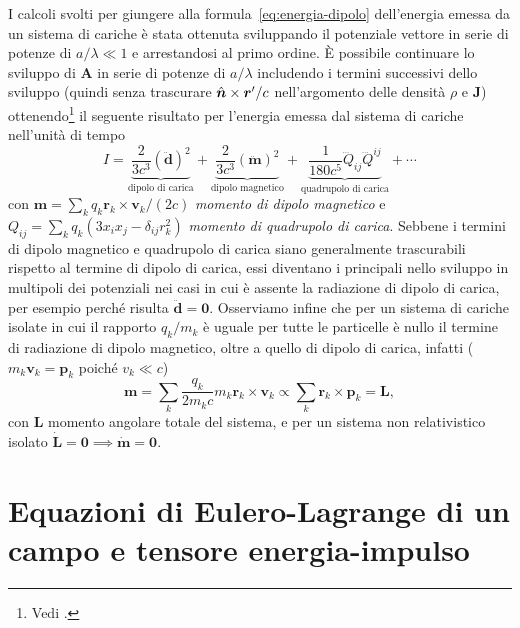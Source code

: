 I calcoli svolti per giungere alla formula~\eqref{eq:energia-dipolo}
dell'energia emessa da un sistema di cariche è stata ottenuta sviluppando il
potenziale vettore in serie di potenze di $a/\lambda \ll 1$ e arrestandosi al
primo ordine.  È possibile continuare lo sviluppo di $\bm{A}$ in serie di
potenze di $a/\lambda$ includendo i termini successivi dello sviluppo (quindi
senza trascurare $\hat{\bm{n}}\times\bm{r}'/c$ nell'argomento delle densità $\rho$
e $\bm{J}$) ottenendo\footnote{Vedi \textcite[249-251]{landau:campi}.} il
seguente risultato per l'energia emessa dal sistema di cariche nell'unità di
tempo
\begin{equation}
  \label{eq:potenza-onde-em}
  I = \underbrace{\frac{2}{3c^{3}} (\ddot{\bm{d}})^{2}}_{\text{dipolo di carica}} +
  \underbrace{\frac{2}{3c^{3}} (\ddot{\bm{m}})^{2}}_{\text{dipolo magnetico}} +
  \underbrace{\frac{1}{180c^{5}}
    \dddot{Q}_{ij}\dddot{Q}^{ij}}_{\text{quadrupolo di carica}} + \cdots
\end{equation}
con $\bm{m} = \sum_{k} q_{k} \bm{r}_{k} \times \bm{v}_{k}/(2c)$
\emph{momento di dipolo magnetico} e
$Q_{ij} = \sum_{k} q_{k}(3x_{i}x_{j} - \delta_{ij}r_{k}^{2})$
\emph{momento di quadrupolo di carica}.
Sebbene i termini di dipolo magnetico e quadrupolo di carica siano generalmente
trascurabili rispetto al termine di dipolo di carica, essi diventano i
principali nello sviluppo in multipoli dei potenziali nei casi in cui è assente
la radiazione di dipolo di carica, per esempio perché risulta
$\ddot{\bm{d}} = \bm{0}$.  Osserviamo infine che per un sistema di cariche
isolate in cui il rapporto $q_{k}/m_{k}$ è uguale per tutte le particelle è
nullo il termine di radiazione di dipolo magnetico, oltre a quello di dipolo di
carica, infatti ($m_{k} \bm{v}_{k} = \bm{p}_{k}$ poiché $v_{k} \ll c$)
\begin{equation}
  \bm{m} = \sum_{k} \frac{q_{k}}{2m_{k}c} m_{k} \bm{r}_{k} \times \bm{v}_{k}
  \propto \sum_{k} \bm{r}_{k} \times \bm{p}_{k} = \bm{L},
\end{equation}
con $\bm{L}$ momento angolare totale del sistema, e per un sistema non
relativistico isolato $\dot{\bm{L}} = \bm{0} \implies \dot{\bm{m}} = \bm{0}$.

\section{Equazioni di Eulero-Lagrange di un campo e tensore energia-impulso}
\label{sec:tensore-energia-impulso}

